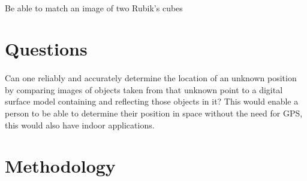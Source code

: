\documentclass{article}
\begin{document}
\paragraph{}
Be able to match an image of two Rubik's cubes

\section{Questions}
\paragraph{}
Can one reliably and accurately determine the location of an unknown position by comparing images of objects taken from that unknown point to a digital surface model containing and reflecting those objects in it? This would enable a person to be able to determine their position in space without the need for GPS, this would also have indoor applications.


\section{Methodology}
\end{document}
